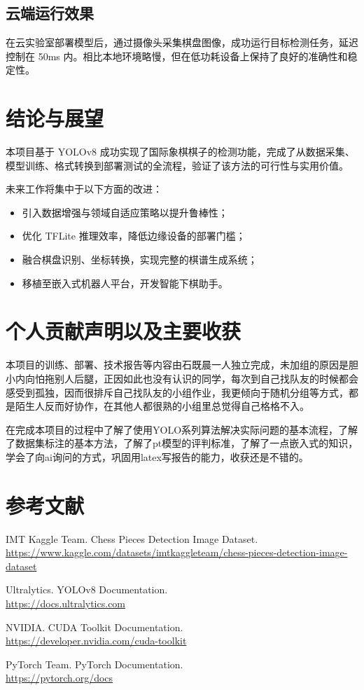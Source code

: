 \documentclass[UTF8,zihao=-4]{oucart}
\begin{document}
\subsection{云端运行效果}

在云实验室部署模型后，通过摄像头采集棋盘图像，成功运行目标检测任务，延迟控制在 50ms 内。相比本地环境略慢，但在低功耗设备上保持了良好的准确性和稳定性。

\section{结论与展望}

本项目基于 YOLOv8 成功实现了国际象棋棋子的检测功能，完成了从数据采集、模型训练、格式转换到部署测试的全流程，验证了该方法的可行性与实用价值。

未来工作将集中于以下方面的改进：

\begin{itemize}
    \item 引入数据增强与领域自适应策略以提升鲁棒性；
    \item 优化 TFLite 推理效率，降低边缘设备的部署门槛；
    \item 融合棋盘识别、坐标转换，实现完整的棋谱生成系统；
    \item 移植至嵌入式机器人平台，开发智能下棋助手。
\end{itemize}

\section{个人贡献声明以及主要收获}

   本项目的训练、部署、技术报告等内容由石既晨一人独立完成，未加组的原因是胆小内向怕拖别人后腿，正因如此也没有认识的同学，每次到自己找队友的时候都会感受到孤独，因而很排斥自己找队友的小组作业，我更倾向于随机分组等方式，都是陌生人反而好协作，在其他人都很熟的小组里总觉得自己格格不入。

   
   在完成本项目的过程中了解了使用YOLO系列算法解决实际问题的基本流程，了解了数据集标注的基本方法，了解了pt模型的评判标准，了解了一点嵌入式的知识，学会了向ai询问的方式，巩固用latex写报告的能力，收获还是不错的。


\newpage
\section*{参考文献}

\begin{thebibliography}{99}
IMT Kaggle Team. Chess Pieces Detection Image Dataset.\\
\url{https://www.kaggle.com/datasets/imtkaggleteam/chess-pieces-detection-image-dataset}

Ultralytics. YOLOv8 Documentation.\\
\url{https://docs.ultralytics.com}

NVIDIA. CUDA Toolkit Documentation.\\
\url{https://developer.nvidia.com/cuda-toolkit}

PyTorch Team. PyTorch Documentation.\\
\url{https://pytorch.org/docs}
\end{thebibliography}
\end{document}

